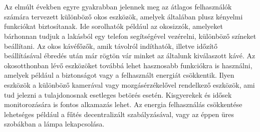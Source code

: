 \chapter{\bevezetes}


Az elmúlt években egyre gyakrabban jelennek meg az átlagos felhasználók számára tervezett különböző okos eszközök, amelyek általában plusz kényelmi funkciókat biztosítanak. Ide sorolhatók például az okosizzók, amelyeket bárhonnan tudjuk a lakásból egy telefon segítségével vezérelni, különböző színeket beállítani. Az okos kávéfőzők, amik távolról indíthatók, illetve időzítő beállításával ébredés után már rögtön vár minket az általunk kiválaszott kávé. Az okosotthonban lévő eszközöket továbbá lehet hasznosabb funkciókra is használni, amelyek például a biztonságot vagy a felhasznált energiát csökkentik. Ilyen eszközök a különböző kamerával vagy mozgásérzékelővel rendelkező eszközök, ami tud jelezni a tulajdonosnak esetleges betörés esetén. Kisgyerekek és idősek monitorozására is fontos alkamazás lehet. Az energia felhasználás csökkentése lehetséges például a fűtés decentralizált szabályzásával, vagy az éppen üres szobákban a lámpa lekapcsolása. 

